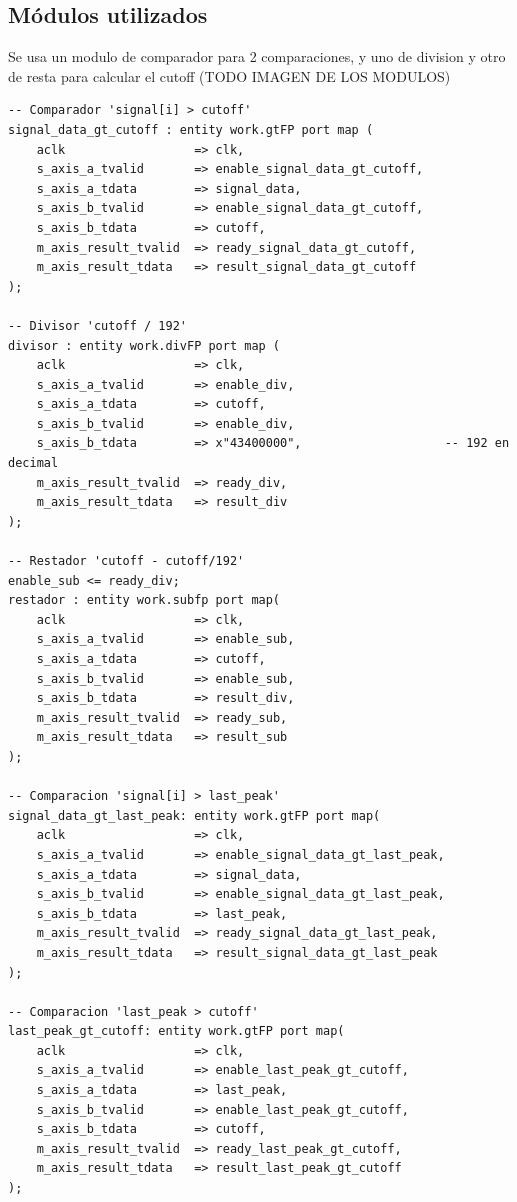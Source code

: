 \subsection{Módulos utilizados}

Se usa un modulo de comparador para 2 comparaciones, y uno de division y otro de resta para calcular el cutoff
(TODO IMAGEN DE LOS MODULOS)
\lstset{language=VHDL, breaklines=true, basicstyle=\footnotesize}
\begin{lstlisting}[frame=single]
-- Comparador 'signal[i] > cutoff' 
signal_data_gt_cutoff : entity work.gtFP port map (
    aclk                  => clk,
    s_axis_a_tvalid       => enable_signal_data_gt_cutoff,
    s_axis_a_tdata        => signal_data,
    s_axis_b_tvalid       => enable_signal_data_gt_cutoff,
    s_axis_b_tdata        => cutoff,
    m_axis_result_tvalid  => ready_signal_data_gt_cutoff,
    m_axis_result_tdata   => result_signal_data_gt_cutoff
);

-- Divisor 'cutoff / 192'
divisor : entity work.divFP port map (
    aclk                  => clk,
    s_axis_a_tvalid       => enable_div,
    s_axis_a_tdata        => cutoff,
    s_axis_b_tvalid       => enable_div,
    s_axis_b_tdata        => x"43400000",                    -- 192 en decimal
    m_axis_result_tvalid  => ready_div,
    m_axis_result_tdata   => result_div
);

-- Restador 'cutoff - cutoff/192'
enable_sub <= ready_div;
restador : entity work.subfp port map(
    aclk                  => clk,
    s_axis_a_tvalid       => enable_sub,
    s_axis_a_tdata        => cutoff,
    s_axis_b_tvalid       => enable_sub,
    s_axis_b_tdata        => result_div,
    m_axis_result_tvalid  => ready_sub,
    m_axis_result_tdata   => result_sub
);

-- Comparacion 'signal[i] > last_peak'
signal_data_gt_last_peak: entity work.gtFP port map(
    aclk                  => clk,
    s_axis_a_tvalid       => enable_signal_data_gt_last_peak,
    s_axis_a_tdata        => signal_data,
    s_axis_b_tvalid       => enable_signal_data_gt_last_peak,
    s_axis_b_tdata        => last_peak,
    m_axis_result_tvalid  => ready_signal_data_gt_last_peak,
    m_axis_result_tdata   => result_signal_data_gt_last_peak
);

-- Comparacion 'last_peak > cutoff'
last_peak_gt_cutoff: entity work.gtFP port map(
    aclk                  => clk,
    s_axis_a_tvalid       => enable_last_peak_gt_cutoff,
    s_axis_a_tdata        => last_peak,
    s_axis_b_tvalid       => enable_last_peak_gt_cutoff,
    s_axis_b_tdata        => cutoff,
    m_axis_result_tvalid  => ready_last_peak_gt_cutoff,
    m_axis_result_tdata   => result_last_peak_gt_cutoff
);
\end{lstlisting}
